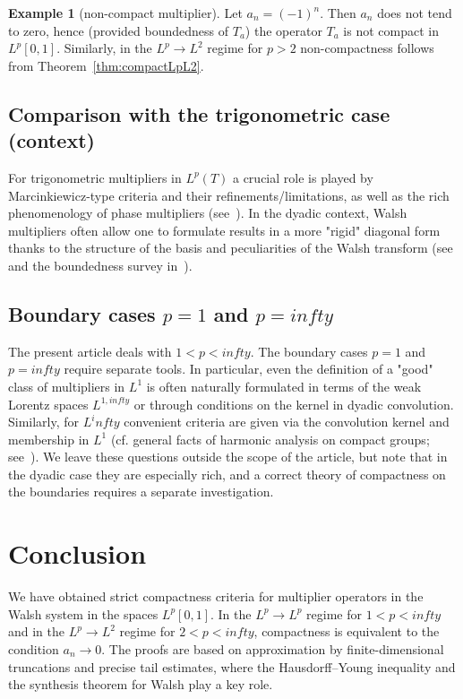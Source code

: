 \documentclass[a4paper,12pt]{article}
\theoremstyle{definition}
\theoremstyle{remark}
\theoremstyle{definition}
\newtheorem{example}[theorem]{Example}
\newcommand{\Lp}{L^p[0,1]}
\def\infty{infty}%
\def\mathbb#1{#1}%
\begin{document}
\begin{example}[non-compact multiplier]
Let $a_n=(-1)^n$.
Then $a_n$ does not tend to zero, hence (provided boundedness of $T_a$) the operator $T_a$ is not compact in $\Lp$.
Similarly, in the $L^p\to L^2$ regime for $p>2$ non-compactness follows from Theorem~\ref{thm:compactLpL2}.
\end{example}

\subsection{Comparison with the trigonometric case (context)}

For trigonometric multipliers in $L^p(\mathbb{T})$ a crucial role is played by
Marcinkiewicz-type criteria and their refinements/limitations,
as well as the rich phenomenology of phase multipliers (see~\cite{Zygmund1959,SteinHA,GrafakosCF}).
In the dyadic context, Walsh multipliers often allow one to formulate results
in a more "rigid" diagonal form thanks to the structure of the basis and peculiarities of the Walsh transform
(see \cite{GolubovEfimovSkvortsov1991,SchippWadeSimon1990} and the boundedness survey in~\cite{BoundednessWalsh}).

\subsection{Boundary cases $p=1$ and $p=\infty$}

The present article deals with $1<p<\infty$.
The boundary cases $p=1$ and $p=\infty$ require separate tools.
In particular, even the definition of a "good" class of multipliers in $L^1$
is often naturally formulated in terms of the weak Lorentz spaces $L^{1,\infty}$
or through conditions on the kernel in dyadic convolution.
Similarly, for $L^\infty$ convenient criteria are given via the convolution kernel and membership in $L^1$
(cf. general facts of harmonic analysis on compact groups; see~\cite{SteinHA}).
We leave these questions outside the scope of the article, but note that in the dyadic case they are especially rich,
and a correct theory of compactness on the boundaries requires a separate investigation.

\section{Conclusion}

We have obtained strict compactness criteria for multiplier operators in the Walsh system
in the spaces $L^p[0,1]$.
In the $L^p\to L^p$ regime for $1<p<\infty$ and in the $L^p\to L^2$ regime for $2<p<\infty$, compactness is equivalent to the condition $a_n\to0$.
The proofs are based on approximation by finite-dimensional truncations and precise tail estimates,
where the Hausdorff–Young inequality and the synthesis theorem for Walsh play a key role.
\end{document}
